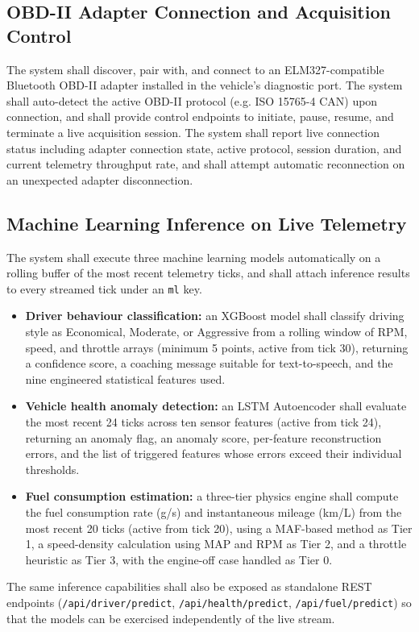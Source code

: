 \documentclass[10pt,a4paper]{report}
\begin{document}
\subsection{OBD-II Adapter Connection and Acquisition Control}
The system shall discover, pair with, and connect to an ELM327-compatible Bluetooth OBD-II adapter installed in the vehicle's diagnostic port. The system shall auto-detect the active OBD-II protocol (e.g. ISO 15765-4 CAN) upon connection, and shall provide control endpoints to initiate, pause, resume, and terminate a live acquisition session. The system shall report live connection status including adapter connection state, active protocol, session duration, and current telemetry throughput rate, and shall attempt automatic reconnection on an unexpected adapter disconnection. \par

\subsection{Machine Learning Inference on Live Telemetry}
The system shall execute three machine learning models automatically on a rolling buffer of the most recent telemetry ticks, and shall attach inference results to every streamed tick under an \texttt{ml} key. \par
\begin{itemize}
  \item \textbf{Driver behaviour classification:} an XGBoost model shall classify driving style as Economical, Moderate, or Aggressive from a rolling window of RPM, speed, and throttle arrays (minimum 5 points, active from tick 30), returning a confidence score, a coaching message suitable for text-to-speech, and the nine engineered statistical features used.
  \item \textbf{Vehicle health anomaly detection:} an LSTM Autoencoder shall evaluate the most recent 24 ticks across ten sensor features (active from tick 24), returning an anomaly flag, an anomaly score, per-feature reconstruction errors, and the list of triggered features whose errors exceed their individual thresholds.
  \item \textbf{Fuel consumption estimation:} a three-tier physics engine shall compute the fuel consumption rate (g/s) and instantaneous mileage (km/L) from the most recent 20 ticks (active from tick 20), using a MAF-based method as Tier 1, a speed-density calculation using MAP and RPM as Tier 2, and a throttle heuristic as Tier 3, with the engine-off case handled as Tier 0.
\end{itemize}
The same inference capabilities shall also be exposed as standalone REST endpoints (\texttt{/api/driver/predict}, \texttt{/api/health/predict}, \texttt{/api/fuel/predict}) so that the models can be exercised independently of the live stream. \par
\end{document}
